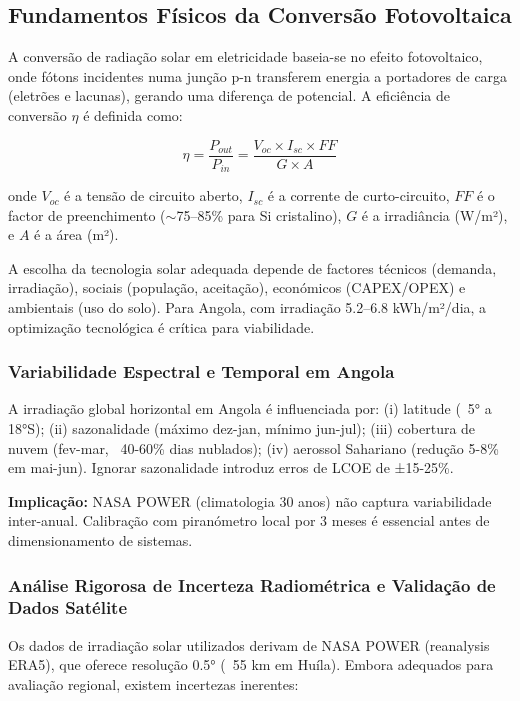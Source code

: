 \documentclass[12pt, a4paper]{article}
\begin{document}
\subsection{Fundamentos Físicos da Conversão Fotovoltaica}

A conversão de radiação solar em eletricidade baseia-se no efeito fotovoltaico, onde fótons incidentes numa junção p-n transferem energia a portadores de carga (eletrões e lacunas), gerando uma diferença de potencial. A eficiência de conversão $\eta$ é definida como:

\begin{equation}
\eta = \frac{P_{out}}{P_{in}} = \frac{V_{oc} \times I_{sc} \times FF}{G \times A}
\end{equation}

onde $V_{oc}$ é a tensão de circuito aberto, $I_{sc}$ é a corrente de curto-circuito, $FF$ é o factor de preenchimento ($\sim$75--85\% para Si cristalino), $G$ é a irradiância (W/m²), e $A$ é a área (m²).

A escolha da tecnologia solar adequada depende de factores técnicos (demanda, irradiação), sociais (população, aceitação), económicos (CAPEX/OPEX) e ambientais (uso do solo). Para Angola, com irradiação 5.2--6.8 kWh/m²/dia, a optimização tecnológica é crítica para viabilidade.

\subsubsection{Variabilidade Espectral e Temporal em Angola}

A irradiação global horizontal em Angola é influenciada por: (i) latitude (~5° a 18°S); (ii) sazonalidade (máximo dez-jan, mínimo jun-jul); (iii) cobertura de nuvem (fev-mar, ~40-60\% dias nublados); (iv) aerossol Sahariano (redução 5-8\% em mai-jun). Ignorar sazonalidade introduz erros de LCOE de ±15-25\%.

\textbf{Implicação:} NASA POWER (climatologia 30 anos) não captura variabilidade inter-anual. Calibração com piranómetro local por 3 meses é essencial antes de dimensionamento de sistemas.

\subsubsection{Análise Rigorosa de Incerteza Radiométrica e Validação de Dados Satélite}

Os dados de irradiação solar utilizados derivam de NASA POWER (reanalysis ERA5), que oferece resolução 0.5° (~55 km em Huíla). Embora adequados para avaliação regional, existem incertezas inerentes:
\end{document}
